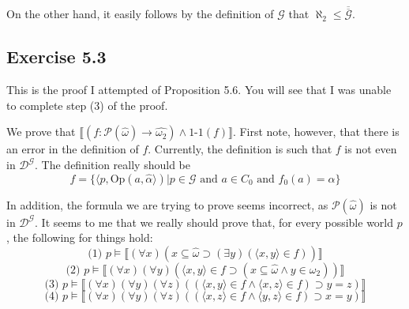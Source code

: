 \documentclass{article}
\newcommand{\lbc}{\llbracket}
\newcommand{\rbc}{\rrbracket}
\theoremstyle{definition}
\begin{document}
On the other hand, it easily follows by the definition of $\mathcal{G}$ that $\aleph_2\le\overline{\overline{\mathcal{G}}}$.

\subsection*{Exercise 5.3}
This is the proof I attempted of Proposition 5.6. You will see that I was unable to complete step (3) of the proof.

We prove that $\lbc (f:\mathcal{P}(\hat{\omega})\rightarrow\widehat{\omega_2})\wedge\textrm{1-1}(f)\rbc$. First note, however, that 
there is an error in the definition of $f$. Currently, the definition is such that $f$ is not even in 
$\mathcal{D}^\mathcal{G}$. The definition really should be 
\[ f=\{\langle p,\textrm{Op}(a,\hat{\alpha}\rangle)|p\in\mathcal{G}\textrm{ and }a\in C_0\textrm{ and }f_0(a)=\alpha\} \]

In addition, the formula we are trying to prove seems incorrect, as $\mathcal{P}(\hat{\omega})$ is not 
in $\mathcal{D}^\mathcal{G}$. It seems to me that we really should prove that, for every possible world $p$, 
the following for things hold:
\[ \textrm{(1) }p\vDash\lbc(\forall x)(x\subseteq\hat{\omega}\supset(\exists y)(\langle x,y\rangle\in f))\rbc \]
\[ \textrm{(2) }p\vDash\lbc(\forall x)(\forall y)(\langle x,y\rangle\in f\supset (x\subseteq\hat{\omega}\wedge y\in\widehat{\omega_2}))\rbc \]
\[ \textrm{(3) }p\vDash\lbc(\forall x)(\forall y)(\forall z)((\langle x,y\rangle\in f\wedge\langle x,z\rangle\in f)\supset y=z)\rbc \]
\[ \textrm{(4) }p\vDash\lbc(\forall x)(\forall y)(\forall z)((\langle x,z\rangle\in f\wedge\langle y,z\rangle\in f)\supset x=y)\rbc \]
\end{document}
